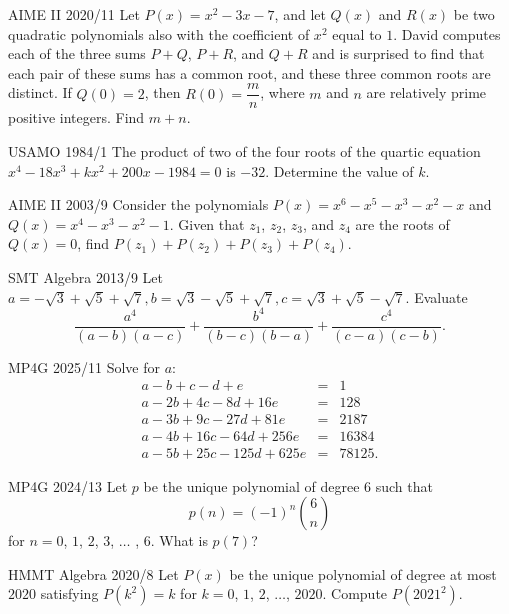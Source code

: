 \documentclass[11pt]{scrartcl}
\begin{document}
\begin{problem}[5]{AIME II 2020/11}
Let $P(x) = x^2 - 3x - 7$, and let $Q(x)$ and $R(x)$ be two quadratic polynomials also with the coefficient of $x^2$ equal to $1$. David computes each of the three sums $P + Q$, $P + R$, and $Q + R$ and is surprised to find that each pair of these sums has a common root, and these three common roots are distinct. If $Q(0) = 2$, then $R(0) = \dfrac mn$, where $m$ and $n$ are relatively prime positive integers. Find $m+n$.
\end{problem}

\begin{problem}[6]{USAMO 1984/1}
The product of two of the four roots of the quartic equation $x^4 - 18x^3 + kx^2+200x-1984=0$ is $-32$. Determine the value of $k$.
\end{problem}

\begin{problem}[7]{AIME II 2003/9}
Consider the polynomials $P(x) = x^6 - x^5 - x^3 - x^2 - x$ and $Q(x) = x^4 - x^3 - x^2 - 1.$ Given that $z_1$, $z_2$, $z_3$, and $z_4$ are the roots of $Q(x) = 0$, find $P(z_1) + P(z_2) + P(z_3) + P(z_4)$.
\end{problem}

\begin{problem}[8]{SMT Algebra 2013/9}
Let $a=-\sqrt{3}+\sqrt{5}+\sqrt{7},b=\sqrt{3}-\sqrt{5}+\sqrt{7},c=\sqrt{3}+\sqrt{5}-\sqrt{7}$. Evaluate \[\frac{a^4}{(a-b)(a-c)}+\frac{b^4}{(b-c)(b-a)}+\frac{c^4}{(c-a)(c-b)}.\]
\end{problem}

\begin{problem}[9]{MP4G 2025/11}
Solve for $a$:
\begin{eqnarray*}
a - b + c - d + e & = & 1 \\
a - 2b + 4c -8d + 16e & = & 128 \\
a - 3b + 9c - 27d + 81e & = & 2187 \\
a-4b+16c-64d+256e & = & 16384 \\
a-5b+25c-125d+625e & = & 78125.
\end{eqnarray*}
\end{problem}

\begin{problem}[10]{MP4G 2024/13}
Let $p$ be the unique polynomial of degree 6 such that \[p(n) = (-1)^n \binom{6}{n}\] for $n = 0$, $1$, $2$, $3$, $\dots$ , $6$. What is $p(7)$?
\end{problem}

\begin{problem}[11]{HMMT Algebra 2020/8}
Let $P(x)$ be the unique polynomial of degree at most $2020$ satisfying $P(k^2)=k$ for $k=0$, $1$, $2$, $\dots$, $2020$. Compute $P(2021^2)$.
\end{problem}
\end{document}
